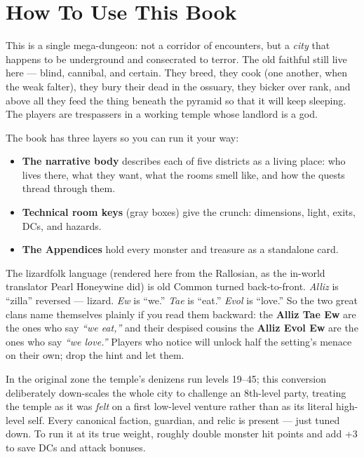 \documentclass[10pt,twoside]{article}
\begin{document}
\section*{How To Use This Book}

This is a single mega-dungeon: not a corridor of encounters, but a \emph{city} that
happens to be underground and consecrated to terror. The old faithful still live
here --- blind, cannibal, and certain. They breed, they cook (one another, when the
weak falter), they bury their dead in the ossuary, they bicker over rank, and above
all they feed the thing beneath the pyramid so that it will keep sleeping. The
players are trespassers in a working temple whose landlord is a god.

The book has three layers so you can run it your way:
\begin{itemize}
\item \textbf{The narrative body} describes each of five districts as a living
place: who lives there, what they want, what the rooms smell like, and how the
quests thread through them.
\item \textbf{Technical room keys} (gray boxes) give the crunch: dimensions, light,
exits, DCs, and hazards.
\item \textbf{The Appendices} hold every monster and treasure as a standalone card.
\end{itemize}

\begin{dmnote}
The lizardfolk language (rendered here from the Rallosian, as the in-world
translator Pearl Honeywine did) is old Common turned back-to-front. \emph{Alliz} is
``zilla'' reversed --- lizard. \emph{Ew} is ``we.'' \emph{Tae} is ``eat.''
\emph{Evol} is ``love.'' So the two great clans name themselves plainly if you read
them backward: the \textbf{Alliz Tae Ew} are the ones who say \emph{``we eat,''} and
their despised cousins the \textbf{Alliz Evol Ew} are the ones who say \emph{``we
love.''} Players who notice will unlock half the setting's menace on their own; drop
the hint and let them.
\end{dmnote}

\begin{dmnote}
In the original zone the temple's denizens run levels 19--45; this conversion
deliberately down-scales the whole city to challenge an 8th-level party, treating
the temple as it was \emph{felt} on a first low-level venture rather than as its
literal high-level self. Every canonical faction, guardian, and relic is present ---
just tuned down. To run it at its true weight, roughly double monster hit points and
add +3 to save DCs and attack bonuses.
\end{dmnote}
\end{document}
